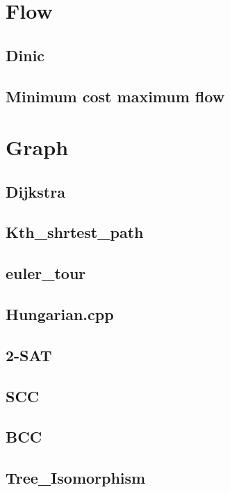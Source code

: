 \section{Flow}
    \subsection{Dinic}
        
    \subsection{Minimum cost maximum flow}
        

\section{Graph}
    \subsection{Dijkstra}
        
    \subsection{Kth\_shrtest\_path}
        
    \subsection{euler\_tour}
        
    \subsection{Hungarian.cpp}
        
    \subsection{2-SAT}
        
    \subsection{SCC}
        
    \subsection{BCC}
        
    \subsection{Tree\_Isomorphism}
        

